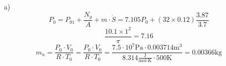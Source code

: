 a) \\
\[
P_0 = P_{01} + \frac{N_g}{A} + m \cdot \dot{S} = 7.105P_0 + \left(32 \times 0.12 \right) \frac{3.87}{3.7}
\]
\[
\frac{10.1 \times 1^2}{\pi} = 7.16
\]
\[
m_u = \frac{P_0 \cdot V_0}{R \cdot T_0} = \frac{P_0 \cdot V_0}{R \cdot T_0} = \frac{7.5 \cdot 10^7 \text{Pa} \cdot 0.003714 \text{m}^3}{8.314 \frac{\text{J}}{\text{mol} \cdot \text{K}} \cdot 500 \text{K}} = 0.00366 \text{kg}
\]